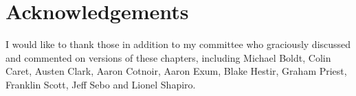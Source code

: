 \clearpage
{}
\chapter*{Acknowledgements}
I would like to thank those in addition to my committee who graciously discussed and commented on versions of these chapters, including Michael Boldt, Colin Caret, Austen Clark, Aaron Cotnoir, Aaron Exum, Blake Hestir, Graham Priest, Franklin Scott, Jeff Sebo and Lionel Shapiro.


\clearpage
{}
\tableofcontents